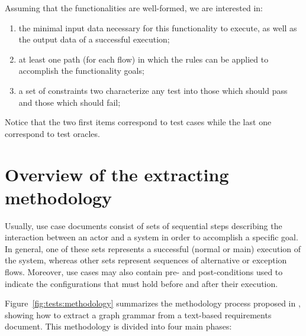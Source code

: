 Assuming that the functionalities are well-formed, we are interested in:

\begin{enumerate}
\item the minimal input data necessary for this functionality to execute, as well as the output data of a successful execution;

\item at least one path (for each flow) in which the rules can be applied to accomplish the functionality goals;

\item a set of constraints two characterize any test into those which should pass and those which should fail;

\end{enumerate}

Notice that the two first items correspond to test cases while the last one correspond to test oracles.


\section{Overview of the extracting methodology}

Usually, use case documents consist of sets of sequential steps describing the interaction between an actor and a system in order to accomplish a specific goal. In general, one of these sets represents a successful (normal or main) execution of the system, whereas other sets represent sequences of alternative or exception flows. Moreover, use cases may also contain pre- and post-conditions used to indicate the configurations that must hold before and after their execution.

Figure~\ref{fig:tests:methodology} summarizes the methodology process proposed in \cite{Junior2015}, showing how to extract a graph grammar from a text-based requirements document. This methodology is divided into four main phases:


